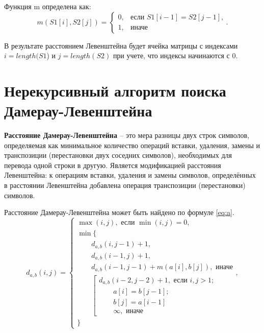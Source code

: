 Функция m определена как:
\begin{equation}
\label{eq:m2}
m(S1[i], S2[j]) = \begin{cases}
0, &\text{если $S1[i - 1] = S2[j - 1]$,}\\
1, &\text{иначе}
\end{cases}.
\end{equation}
 
В результате расстоянием Левенштейна будет ячейка матрицы с индексами $i = length(S1$) и $j = length(S2)$ при учете, что индексы начинаются с 0.


\section{Нерекурсивный алгоритм поиска \\Дамерау-Левенштейна}

\textbf{Расстояние Дамерау-Левенштейна \cite{Dameray_Levenshtein}} -- это мера разницы двух строк символов, определяемая как минимальное количество операций вставки, удаления, замены и транспозиции (перестановки двух соседних символов), необходимых для перевода одной строки в другую. Является модификацией расстояния Левенштейна: к операциям вставки, удаления и замены символов, определённых в расстоянии Левенштейна добавлена операция транспозиции (перестановки) символов.

Расстояние Дамерау-Левенштейна может быть найдено по формуле \ref{eq:a}.
\begin{equation}
	\label{eq:a}
	d_{a,b}(i, j) = \begin{cases}
		\max(i, j), \text{ если }\min(i, j) = 0,\\
		\min \lbrace \\
			\qquad d_{a,b}(i, j-1) + 1,\\
			\qquad d_{a,b}(i-1, j) + 1,\\
			\qquad d_{a,b}(i-1, j-1) + m(a[i], b[j]), \text{ иначе}\\
			\qquad \left[ \begin{array}{cc}d_{a,b}(i-2, j-2) + 1, \text{ если }i,j > 1;\\
			\qquad \text{}a[i] = b[j-1]; \\
			\qquad \text{}b[j] = a[i-1]\\
			\qquad \infty, \text{ иначе}\end{array}\right.\\
		\rbrace
		\end{cases},
\end{equation}

